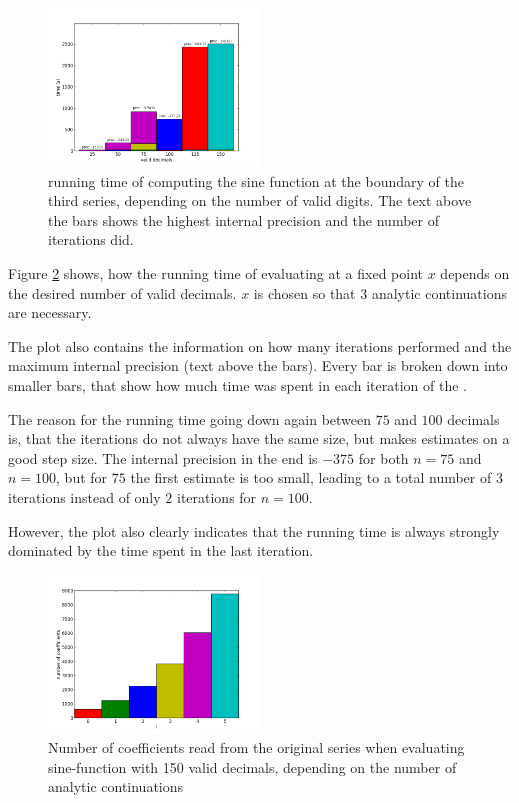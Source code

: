 		\begin{figure}[h]
			\centering
			\includegraphics[width=0.5\textwidth]{img/analytic/sin_for_series_4_dep_on_n.png}
			\caption{running time of \anarect computing the sine function at the boundary of the third series, depending on the number of valid digits. The text above the bars shows the highest internal precision and the number of iterations \irram did.}
			\label{fig:sin dep on n}
		\end{figure}

		Figure \ref{fig:sin dep on n} shows, how the running time of evaluating at a fixed point $x$ depends on the desired number of valid decimals. 
		$x$ is chosen so that $3$ analytic continuations are necessary. 

		The plot also contains the information on how many iterations \irram performed and the maximum internal 
		precision (text above the bars). 
		Every bar is broken down into smaller bars, that show how much time was spent in each iteration of the \irram.

		The reason for the running time going down again between $75$ and $100$ decimals is, that
		the iterations do not always have the same size, but \irram makes estimates on a good step size.
		The internal precision in the end is $-375$ for both $n=75$ and $n=100$, but 
		for $75$ the first estimate is too small, leading to a total number of $3$ iterations instead of only $2$ iterations for $n=100$.

		However, the plot also clearly indicates that the running time is always strongly dominated by the time spent in the last iteration.

		\begin{figure}[h]
			\centering
			\includegraphics[width=0.5\textwidth]{img/analytic/sin_for_coeffs_prec_150_dep_on_series.png}
			\caption{Number of coefficients read from the original series when evaluating sine-function with 150 valid decimals, depending on the number of analytic continuations}
			\label{fig:sin dep on n}
		\end{figure}

